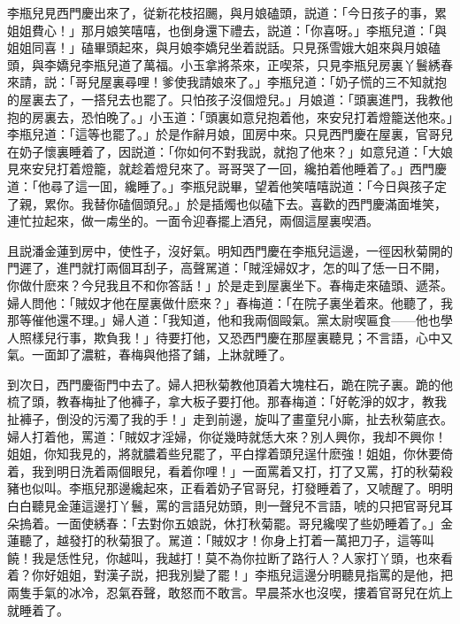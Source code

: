 李瓶兒見西門慶出來了，従新花枝招颺，與月娘磕頭，説道：「今日孩子的事，累姐姐費心！」那月娘笑嘻嘻，也倒身還下禮去，説道：「你喜呀。」李瓶兒道：「與姐姐同喜！」磕畢頭起來，與月娘李嬌兒坐着説話。只見孫雪娥大姐來與月娘磕頭，與李嬌兒李瓶兒道了萬福。小玉拿將茶來，正喫茶，只見李瓶兒房裏丫鬟綉春來請，説：「哥兒屋裏尋哩！爹使我請娘來了。」李瓶兒道：「奶子慌的三不知就抱的屋裏去了，一搭兒去也罷了。只怕孩子沒個燈兒。」月娘道：「頭裏進門，我教他抱的房裏去，恐怕晚了。」小玉道：「頭裏如意兒抱着他，來安兒打着燈籠送他來。」李瓶兒道：「這等也罷了。」於是作辭月娘，囬房中來。只見西門慶在屋裏，官哥兒在奶子懷裏睡着了，因説道：「你如何不對我説，就抱了他來？」如意兒道：「大娘見來安兒打着燈籠，就趁着燈兒來了。哥哥哭了一回，纔拍着他睡着了。」西門慶道：「他尋了這一囬，纔睡了。」李瓶兒説畢，望着他笑嘻嘻説道：「今日與孩子定了親，累你。我替你磕個頭兒。」於是插燭也似磕下去。喜歡的西門慶滿面堆笑，連忙拉起來，做一䖏坐的。一面令迎春擺上酒兒，兩個這屋裏喫酒。

且説潘金蓮到房中，使性子，沒好氣。明知西門慶在李瓶兒這邊，一徑因秋菊開的門遲了，進門就打兩個耳刮子，高聲駡道：「賊淫婦奴才，怎的叫了恁一日不開，你做什麽來？今兒我且不和你答話！」於是走到屋裏坐下。春梅走來磕頭、遞茶。婦人問他：「賊奴才他在屋裏做什麽來？」春梅道：「在院子裏坐着來。他聽了，我那等催他還不理。」婦人道：「我知道，他和我兩個毆氣。黨太尉喫匾食——他也學人照樣兒行事，欺負我！」待要打他，又恐西門慶在那屋裏聽見；不言語，心中又氣。一面卸了濃粧，春梅與他搭了鋪，上牀就睡了。

到次日，西門慶衙門中去了。婦人把秋菊教他頂着大塊柱石，跪在院子裏。跪的他梳了頭，教春梅扯了他褲子，拿大板子要打他。那春梅道：「好乾淨的奴才，教我扯褲子，倒没的污濁了我的手！」走到前邊，旋叫了畫童兒小廝，扯去秋菊底衣。婦人打着他，罵道：「賊奴才淫婦，你従幾時就恁大來？別人興你，我却不興你！姐姐，你知我見的，將就膿着些兒罷了，平白撑着頭兒逞什麽強！姐姐，你休要倚着，我到明日洗着兩個眼兒，看着你哩！」一面罵着又打，打了又罵，打的秋菊殺豬也似叫。李瓶兒那邊纔起來，正看着奶子官哥兒，打發睡着了，又唬醒了。明明白白聽見金蓮這邊打丫鬟，罵的言語兒妨頭，則一聲兒不言語，唬的只把官哥兒耳朵摀着。一面使綉春：「去對你五娘説，休打秋菊罷。哥兒纔喫了些奶睡着了。」金蓮聽了，越發打的秋菊狠了。駡道：「賊奴才！你身上打着一萬把刀子，這等叫饒！我是恁性兒，你越叫，我越打！莫不為你拉断了路行人？人家打丫頭，也來看着？你好姐姐，對漢子説，把我別變了罷！」李瓶兒這邊分明聽見指罵的是他，把兩隻手氣的冰冷，忍氣吞聲，敢怒而不敢言。早晨茶水也沒喫，摟着官哥兒在炕上就睡着了。

